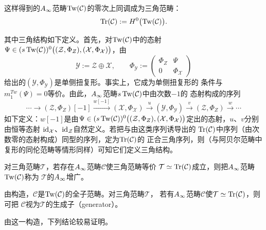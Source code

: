 这样得到的$A_{\infty}$范畴$\operatorname{Tw}(\mathcal{C})$的零次上同调成为三角范畴：
\[
  \operatorname{Tr}(\mathcal{C}):=H^{0}\bigl(\operatorname{Tw}(\mathcal{C})\bigr).
\]

其中三角结构如下定义。首先，对$\operatorname{Tw}(\mathcal{C})$中的态射
$\Psi\in(s\operatorname{Tw}(\mathcal{C}))^{0}\bigl((\mathcal{Z},\Phi_{Z}),
(\mathcal{X},\Phi_{\mathcal{X}})\bigr)$，由
\[
  \mathcal{Y}:=\mathcal{Z}\oplus\mathcal{X},\qquad
  \Phi_{\mathcal{Y}}:=
  \begin{pmatrix}
    \Phi_{Z} & \Psi\\
    0 & \Phi_{\mathcal{X}}
  \end{pmatrix}
\]
给出的$(\mathcal{Y},\Phi_{\mathcal{Y}})$是单侧扭复形。事实上，它成为单侧扭复形的
条件与$m_{1}^{Tw}(\Psi)=0$等价。由此，$A_{\infty}$范畴$s\operatorname{Tw}(\mathcal{C})$中由次数$-1$的
态射构成的序列
\[
  \cdots\to(\mathcal{Z},\Phi_{Z})[-1]\xrightarrow{w[-1]}
  (\mathcal{X},\Phi_{\mathcal{X}})\xrightarrow{u}
  (\mathcal{Y},\Phi_{\mathcal{Y}})\xrightarrow{v}
  (\mathcal{Z},\Phi_{Z})\xrightarrow{w}\cdots
\]
如下定义：$w[-1]$是由$\Psi\in(s\operatorname{Tw}(\mathcal{C}))^{0}\bigl((\mathcal{Z},\Phi_{Z}),
(\mathcal{X},\Phi_{\mathcal{X}})\bigr)$定出的态射，$u$、$v$分别由恒等态射
$\mathrm{id}_{\mathcal{X}}$、$\mathrm{id}_{\mathcal{Z}}$自然定义。若把与由这类序列诱导出的
$\operatorname{Tr}(\mathcal{C})$中序列（由次数零的态射构成）同型的序列，定为$\operatorname{Tr}(\mathcal{C})$的
正合三角序列，则（与阿贝尔范畴中复形的同伦范畴等情形同样）可知它们定义三角结构。


\begin{definition}\label{def:c02-3.1}
对三角范畴$\mathcal{T}$，若存在$A_{\infty}$范畴$\mathcal{C}$使三角范畴等价
$\mathcal{T}\simeq\operatorname{Tr}(\mathcal{C})$成立，则把$A_{\infty}$范畴$\operatorname{Tw}(\mathcal{C})$称为
$\mathcal{T}$的$A_{\infty}$增广。
\end{definition}

由构造，$\mathcal{C}$是$\operatorname{Tw}(\mathcal{C})$的全子范畴。对三角范畴$\mathcal{T}$，
若有$A_{\infty}$范畴$\mathcal{C}$使$\mathcal{T}\simeq\operatorname{Tr}(\mathcal{C})$，则可把
$\mathcal{C}$视为$\mathcal{T}$的生成子（generator）。


由这一构造，下列结论较易证明。

